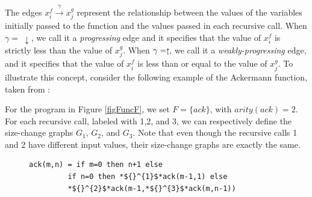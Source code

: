 \documentclass{article}
\begin{document}
The edges $x_i^f \xrightarrow{\gamma} x_j^g$ represent the relationship between the values of the variables initially passed to the function and the values passed in each recursive call. When $\gamma = \ \downarrow$, we call it a \emph{progressing} edge and it specifies that the value of $x_i^f$ is strictly less than the value of $x_j^g$. When $\gamma = \downmapsto$, we call it a \emph{weakly-progressing} edge, and it specifies that the value of $x_i^f$ is less than or equal to the value of $x_j^g$. To illustrate this concept, consider the following example of the Ackermann function, taken from \cite{Lee2}: 

\begin{example}
\label{ExampleSCT1}
For the program in Figure \ref{figFuncF}, we set $F = \{ ack\}$, with $arity(ack) = 2$. For each recursive call, labeled with 1,2, and 3, we can respectively define the size-change graphs $G_1$, $G_2$, and $G_3$. Note that even though the recursive calls 1 and 2 have different input values, their size-change graphs are exactly the same.


\begin{figure}[ht]
  \vspace{0.5cm}
  \centering
  \begin{minipage}[b]{0.45\textwidth}
    \begin{lstlisting}[basicstyle=\normalsize\ttfamily]
ack(m,n) = if m=0 then n+1 else
         if n=0 then *${}^{1}$*ack(m-1,1) else
         *${}^{2}$*ack(m-1,*${}^{3}$*ack(m,n-1))
    \end{lstlisting}
  \end{minipage}
  \begin{minipage}[b]{0.25\textwidth}
    \centering
    
    \vspace{0.1cm}
    

\end{minipage}
\end{figure}
\end{example}
\end{document}
